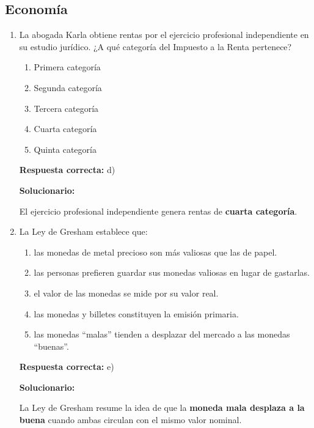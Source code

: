 \subsection*{Economía}

\begin{enumerate}[resume]

	
	\item La abogada Karla obtiene rentas por el ejercicio profesional independiente en su estudio jurídico. ¿A qué categoría del Impuesto a la Renta pertenece?
	\begin{enumerate}[label=\alph*)]
		\item Primera categoría
		\item Segunda categoría
		\item Tercera categoría
		\item Cuarta categoría
		\item Quinta categoría
	\end{enumerate}
	\textbf{Respuesta correcta:} d)
	
	\vspace{2mm}
	\textbf{Solucionario:}
	
	El ejercicio profesional independiente genera rentas de \textbf{cuarta categoría}.
	

	
	\vspace{6mm}
	
	\item La Ley de Gresham establece que:
	\begin{enumerate}[label=\alph*)]
		\item las monedas de metal precioso son más valiosas que las de papel.
		\item las personas prefieren guardar sus monedas valiosas en lugar de gastarlas.
		\item el valor de las monedas se mide por su valor real.
		\item las monedas y billetes constituyen la emisión primaria.
		\item las monedas ``malas'' tienden a desplazar del mercado a las monedas ``buenas''.
	\end{enumerate}
	\textbf{Respuesta correcta:} e)
	
	\vspace{2mm}
	\textbf{Solucionario:}
	
	La Ley de Gresham resume la idea de que la \textbf{moneda mala desplaza a la buena} cuando ambas circulan con el mismo valor nominal.
	


\end{enumerate}
